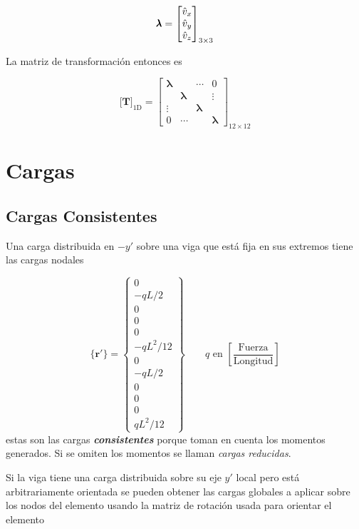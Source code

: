 \documentclass[11pt, a4paper,titlepage]{article}
\newcommand{\Mme}[1]{\boldsymbol{[}\mathbf{#1} \boldsymbol{]}}
\newcommand{\Cme}[1]{\boldsymbol{\{ }\mathbf{#1} \boldsymbol{\}} }
\newcommand{\feaPP}{null.tex}
\begin{document}
\[
\pmb{\lambda} = \begin{bmatrix}
\hat{v}_x \\
\hat{v}_y \\
\hat{v}_z 
\end{bmatrix}_{3\times3}
\]

La matriz de transformación entonces es

\begin{equation}
	\Mme{T}_{\mathrm{1D}}=\begin{bmatrix}
	\pmb{\lambda} & &\cdots & 0 \\
	 &\pmb{\lambda} &  &\vdots \\
	\vdots & &\pmb{\lambda} & \\
	0 &\cdots & & \pmb{\lambda}
	\end{bmatrix}_{12\times 12}
\end{equation}


\section{Cargas}
\subsection*{Cargas Consistentes}
Una carga distribuida en $-y'$ sobre una viga que está fija en sus extremos tiene las cargas nodales

\begin{equation} \label{eq:CargaDistribuidaElemento}
	\Cme{r'} = \begin{Bmatrix}
	0 \\
	-qL/2 \\
	0\\
	0\\
	0\\
	-qL^2/12\\
	0\\
	-qL/2 \\
	0\\
	0\\
	0\\
	qL^2/12
	\end{Bmatrix}
	\qquad q \text{  en } \left[\frac{\text{Fuerza}}{\text{Longitud}} \right]
\end{equation}
estas son las cargas \textbf{\textit{consistentes}} porque toman en cuenta los momentos generados. Si se omiten los momentos se llaman \textit{cargas reducidas}.

Si la viga tiene una carga distribuida sobre su eje $y'$ local pero está arbitrariamente orientada se pueden obtener las cargas globales a aplicar sobre los nodos del elemento usando la matriz de rotación usada para orientar el elemento
\end{document}
